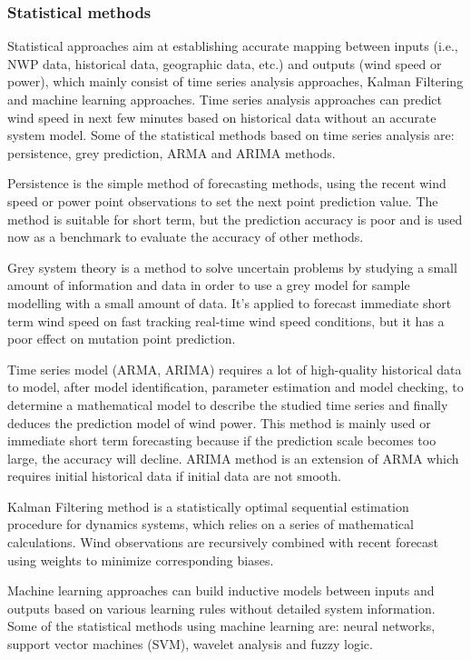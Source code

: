 \subsubsection{Statistical methods}
Statistical approaches aim at establishing accurate mapping between inputs (i.e., NWP data, historical data, geographic data, etc.) and outputs (wind speed or power), which mainly consist of time series analysis approaches, Kalman Filtering and machine learning approaches.
Time series analysis approaches can predict wind speed in next few minutes based on historical data without an accurate system model. Some of the statistical methods based on time series analysis are: persistence, grey prediction, ARMA and ARIMA methods. 

Persistence is the simple method of forecasting methods, using the recent wind speed or power point observations to set the next point prediction value. The method is suitable for short term, but the prediction accuracy is poor and is used now as a benchmark to evaluate the accuracy of other methods.

Grey system theory is a method to solve uncertain problems by studying a small amount of information and data in order to use a grey model for sample modelling with a small amount of data. It's applied to forecast immediate short term wind speed on fast tracking real-time wind speed conditions, but it has a poor effect on mutation point prediction.

Time series model (ARMA, ARIMA) requires a lot of high-quality historical data to model, after model identification, parameter estimation and model checking, to determine a mathematical model to describe the studied time series and finally deduces the prediction model of wind power. This method is mainly used or immediate short term forecasting because if the prediction scale becomes too large, the accuracy will decline. ARIMA method is an extension of ARMA which requires initial historical data if initial data are not smooth.

Kalman Filtering method is a statistically optimal sequential estimation procedure for dynamics systems, which relies on a series of mathematical calculations. Wind observations are recursively combined with recent forecast using weights to minimize corresponding biases.

Machine learning approaches can build inductive models between inputs and outputs based on various learning rules without detailed system information. Some of the statistical methods using machine learning are: neural networks, support vector machines (SVM), wavelet analysis and fuzzy logic.


